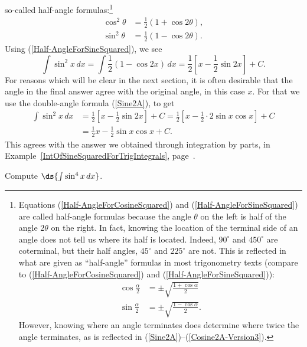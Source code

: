 so-called half-angle formulas:\footnote{%
Equations (\ref{Half-AngleForCosineSquared}) 
and (\ref{Half-AngleForSineSquared})
are called half-angle formulas because the 
angle $\theta$ on the left is half of the angle $2\theta$ on the
right.  In fact, knowing the location of the terminal side of an
angle does not tell us where its half is located.
Indeed, $90^\circ$ and $450^\circ$ are coterminal, but 
their half angles, $45^\circ$ and $225^\circ$ are not.
This is reflected in what are given as ``half-angle'' formulas
in most trigonometry texts (compare to
(\ref{Half-AngleForCosineSquared}) and (\ref{Half-AngleForSineSquared})):
\begin{align*}
\cos\frac{\alpha}2&=\pm\sqrt{\frac{1+\cos\alpha}2}\\
\sin\frac{\alpha}2&=\pm\sqrt{\frac{1-\cos\alpha}2}.\end{align*}
However, knowing where an angle terminates does determine where
twice the angle terminates, as is reflected in 
(\ref{Sine2A})--(\ref{Cosine2A-Version3}).
}
\begin{align}
\cos^2\theta&=\frac12\left(1+\cos2\theta\right),
              \label{Half-AngleForCosineSquared}\\
\sin^2\theta&=\frac12\left(1-\cos2\theta\right).
             \label{Half-AngleForSineSquared}
\end{align}
Using (\ref{Half-AngleForSineSquared}), we see
$$\int\sin^2x\,dx=\int\frac12(1-\cos2x)\,dx
=\frac12\left[x-\frac12\sin2x\right]+C.$$
For reasons which will be clear in the next section, it is
often desirable that the angle in the final answer agree
with the original angle, in this case $x$.
For that we use the double-angle formula (\ref{Sine2A}),
to get
\begin{align*}\int\sin^2x\,dx&=\frac12\left[x-\frac12\sin2x\right]+C
 =\frac12\left[x-\frac12\cdot2\sin x\cos x\right]+C\\
 &=\frac12x-\frac12\sin x\cos x+C.\end{align*}
This agrees with the answer we obtained through
integration by parts, in 
Example~\ref{IntOfSineSquaredForTrigIntegrals},
page~\pageref{IntOfSineSquaredForTrigIntegrals}.

\newpage
\bex Compute $\ds{\int\sin^4x\,dx}$.

